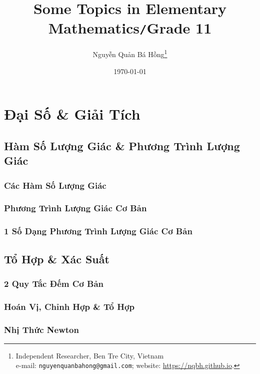 \documentclass[oneside]{book}
\title{Some Topics in Elementary Mathematics\texttt{/}Grade 11}
\author{Nguyễn Quản Bá Hồng\footnote{Independent Researcher, Ben Tre City, Vietnam\\e-mail: \texttt{nguyenquanbahong@gmail.com}; website: \url{https://nqbh.github.io}.}}
\date{\today}
\numberwithin{equation}{section}
\begin{document}
\frontmatter
\maketitle
\setcounter{secnumdepth}{4}
\setcounter{tocdepth}{3}
\tableofcontents
\newpage


\mainmatter

\part{Đại Số \& Giải Tích}

\chapter{Hàm Số Lượng Giác \& Phương Trình Lượng Giác}

\section{Các Hàm Số Lượng Giác}

\section{Phương Trình Lượng Giác Cơ Bản}

\section{1 Số Dạng Phương Trình Lượng Giác Cơ Bản}


\chapter{Tổ Hợp \& Xác Suất}

\section{2 Quy Tắc Đếm Cơ Bản}

\section{Hoán Vị, Chỉnh Hợp \& Tổ Hợp}

\section{Nhị Thức Newton}
\end{document}
